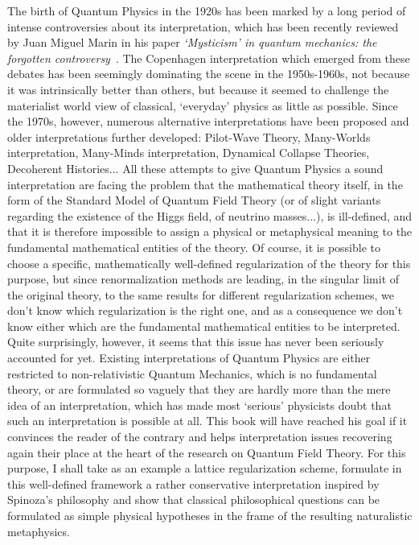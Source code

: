 \documentclass[10pt,a4paper,twoside,openany]{book}
\begin{document}
The birth of Quantum Physics in the 1920s has been marked by a long period of intense controversies about its interpretation, which has been recently reviewed by Juan Miguel Marin in his paper \textit{‘Mysticism’ in quantum mechanics: the forgotten controversy}~\cite{Marin2009}. The Copenhagen interpretation which emerged from these debates has been seemingly dominating the scene in the 1950s-1960s, not because it was intrinsically better than others, but because it seemed to challenge the materialist world view of classical, `everyday' physics as little as possible. Since the 1970s, however, numerous alternative interpretations have been proposed and older interpretations further developed: Pilot-Wave Theory, Many-Worlds interpretation, Many-Minds interpretation, Dynamical Collapse Theories, Decoherent Histories... All these attempts to give Quantum Physics a sound interpretation are facing the problem that the mathematical theory itself, in the form of the Standard Model of Quantum Field Theory (or of slight variants regarding the existence of the Higgs field, of neutrino masses...), is ill-defined, and that it is therefore impossible to assign a physical or metaphysical meaning to the fundamental mathematical entities of the theory. Of course, it is possible to choose a specific, mathematically well-defined regularization of the theory for this purpose, but since renormalization methods are leading, in the singular limit of the original theory, to the same results for different regularization schemes, we don't know which regularization is the right one, and as a consequence we don't know either which are the fundamental mathematical entities to be interpreted. Quite surprisingly, however, it seems that this issue has never been seriously accounted for yet. Existing interpretations of Quantum Physics are either restricted to non-relativistic Quantum Mechanics, which is no fundamental theory, or are formulated so vaguely that they are hardly more than the mere idea of an interpretation, which has made most `serious' physicists doubt that such an interpretation is possible at all. This book will have reached his goal if it convinces the reader of the contrary and helps interpretation issues recovering again their place at the heart of the research on Quantum Field Theory. For this purpose, I shall take as an example a lattice regularization scheme, formulate in this well-defined framework a rather conservative interpretation inspired by Spinoza's philosophy and show that classical philosophical questions can be formulated as simple physical hypotheses in the frame of the resulting naturalistic metaphysics.
\end{document}
